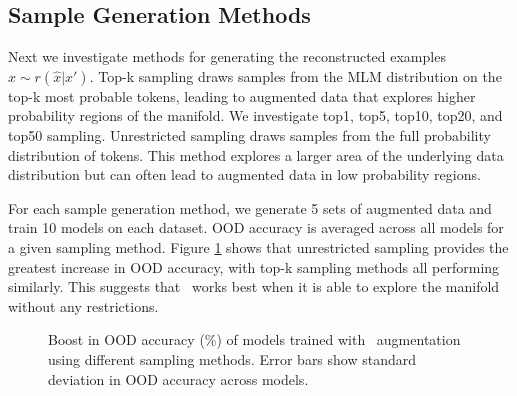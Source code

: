 \subsection{Sample Generation Methods}
\label{subsec:sample_gen_exp}
Next we investigate methods for generating the reconstructed examples $\hat{x} \sim r(\hat{x}|x')$.
Top-k sampling draws samples from the MLM distribution on the top-k most probable tokens, leading to augmented data that explores higher probability regions of the manifold. 
We investigate top1, top5, top10, top20, and top50 sampling.
Unrestricted sampling draws samples from the full probability distribution of tokens.
This method explores a larger area of the underlying data distribution but can often lead to augmented data  in low probability regions.

For each sample generation method, we generate 5 sets of augmented data and train 10 models on each dataset.
OOD accuracy is averaged across all models for a given sampling method.
Figure \ref{fig:sample_gen_exp} shows that unrestricted sampling provides the greatest increase in OOD accuracy, with top-k sampling methods all performing similarly.
This suggests that \ssmba\ works best when it is able to explore the manifold without any restrictions.


\begin{figure}[t]
\centering
{}
\caption{Boost in OOD accuracy (\%) of models trained with \ssmba\ augmentation using different sampling methods. Error bars show standard deviation in OOD accuracy across models.}
\label{fig:sample_gen_exp}
\end{figure}

